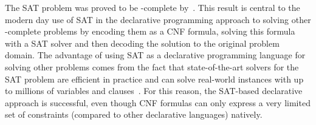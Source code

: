 The SAT problem was proved to be \NP-complete by~\textcite{DBLP:conf/stoc/Cook71}.
This result is central to the modern day use of SAT in the declarative programming approach to solving other \NP-complete problems by encoding them as a CNF formula, solving this formula with a SAT solver and then decoding the solution to the original problem domain.
The advantage of using SAT as a declarative programming language for solving other problems comes from the fact that state-of-the-art solvers for the SAT problem are efficient in practice and can solve real-world instances with up to millions of variables and clauses~\autocite{handbook2-cdcl}.
For this reason, the SAT-based declarative approach is successful, even though CNF formulas can only express a very limited set of constraints (compared to other declarative languages) natively.

